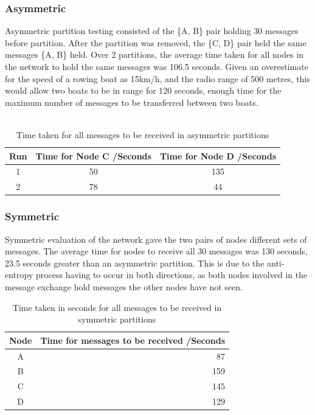 \documentclass[12pt,a4paper]{report}
\begin{document}
\subsubsection{Asymmetric}
Asymmetric partition testing consisted of the \{A, B\} pair holding 30 messages before partition. After the partition was removed, the \{C, D\} pair held the same messages \{A, B\} held. Over 2 partitions, the average time taken for all nodes in the network to hold the same messages was 106.5 seconds. Given an overestimate for the speed of a rowing boat as 15km/h, and the radio range of 500 metres, this would allow two boats to be in range for 120 seconds, enough time for the maximum number of messages to be transferred between two boats.  \\ \\
\begin{table}[h]
\begin{center}
\begin{tabular}{ |c|c|c| } 
\hline
Run & Time for Node C /Seconds & Time for Node D /Seconds \\ 
\hline
1 & 50 & 135 \\ 
\hline
2 & 78 & 44  \\ 
\hline
\end{tabular}
\end{center}
\caption{Time taken for all messages to be received in asymmetric partitions}
\end{table}  
\FloatBarrier 

\subsubsection{Symmetric}
Symmetric evaluation of the network gave the two pairs of nodes different sets of messages.
The average time for nodes to receive all 30 messages was 130 seconds, 23.5 seconds greater than an asymmetric partition. This is due to the anti-entropy process having to occur in both directions, as both nodes involved in the message exchange hold messages the other nodes have not seen. 
\begin{table}[h]
\begin{center}
\begin{tabular}{ |c|r| } 
\hline
Node & Time for messages to be received /Seconds\\ 
\hline
A & 87 \\
\hline
B & 159 \\
\hline
C & 145 \\
\hline
D & 129 \\ 
\hline
\end{tabular}
\end{center}
\caption{Time taken in seconds for all messages to be received in symmetric partitions}
\end{table}  
\FloatBarrier
\end{document}
